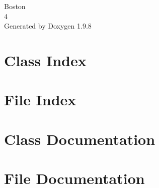 \documentclass[twoside]{book}
\newcommand{\+}{\discretionary{\mbox{\scriptsize$\hookleftarrow$}}{}{}}
\newcommand{\clearemptydoublepage}{%
    \newpage{\pagestyle{empty}\cleardoublepage}%
  }
\begin{document}
  \raggedbottom
    \hypersetup{pageanchor=false,
                bookmarksnumbered=true,
                pdfencoding=unicode
               }
  \begin{titlepage}
  \vspace*{7cm}
  \begin{center}%
  {\Large Boston}\\
  [1ex]\large 4 \\
  \vspace*{1cm}
  {\large Generated by Doxygen 1.9.8}\\
  \end{center}
  \end{titlepage}
  \clearemptydoublepage
  \tableofcontents
  \clearemptydoublepage
  \hypersetup{pageanchor=true}
\chapter{Class Index}

\chapter{File Index}

\chapter{Class Documentation}







\chapter{File Documentation}





























  \backmatter
  \newpage
  \clearemptydoublepage
  \printindex
\end{document}
